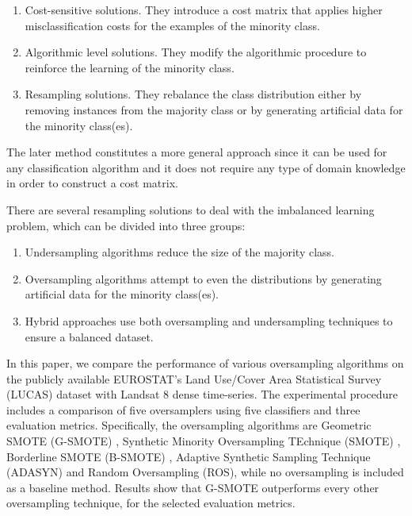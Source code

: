 \documentclass[remotesensing,article,submit,moreauthors,pdftex]{Definitions/mdpi}
\begin{document}
\begin{enumerate}

	\item Cost-sensitive solutions. They introduce a cost matrix that applies
	higher misclassification costs for the examples of the minority class.

	\item Algorithmic level solutions. They modify the algorithmic procedure to
	reinforce the learning of the minority class.

	\item Resampling solutions. They rebalance the class distribution either by
	removing instances from the majority class or by generating artificial data
	for the minority class(es).

\end{enumerate}

The later method constitutes a more general approach since it can be used for
any classification algorithm and it does not require any type of domain
knowledge in order to construct a cost matrix.

There are several resampling solutions to deal with the imbalanced learning
problem, which can be divided into three groups:

\begin{enumerate}

	\item Undersampling algorithms reduce the size of the majority class.

	\item Oversampling algorithms attempt to even the distributions by
	generating artificial data for the minority class(es).

	\item Hybrid approaches use both oversampling and undersampling techniques
	to ensure a balanced dataset.

\end{enumerate}

In this paper, we compare the performance of various oversampling algorithms on
the publicly available EUROSTAT's Land Use/Cover Area Statistical Survey
(LUCAS) dataset \cite{LUCAS2015} with Landsat 8 dense time-series. The
experimental procedure includes a comparison of five oversamplers using five
classifiers and three evaluation metrics. Specifically, the oversampling
algorithms are Geometric SMOTE (G-SMOTE) \cite{Douzas2019}, Synthetic Minority
Oversampling TEchnique (SMOTE) \cite{Chawla2002}, Borderline SMOTE (B-SMOTE)
\cite{Han2005}, Adaptive Synthetic Sampling Technique (ADASYN)
\cite{HaiboHe2008} and Random Oversampling (ROS), while no oversampling is
included as a baseline method. Results show that G-SMOTE outperforms every other
oversampling technique, for the selected evaluation metrics.
\end{document}
